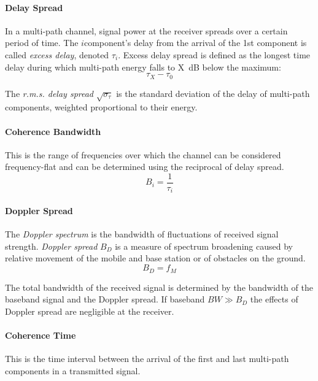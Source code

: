 \paragraph{Delay Spread} In a multi-path channel, signal power at the receiver spreads over a certain period of time. The \(i\)\nth component's delay from the arrival of the 1st component is called \emph{excess delay}, denoted \(\tau_i\)\cite{fuqin}. Excess delay spread is defined as the longest time delay during which multi-path energy falls to X~dB below the maximum:
\[
	\tau_X - \tau_0
\]
\begin{mathDef}
\end{mathDef}
The \emph{r.m.s. delay spread} \(\sqrt{\sigma_\tau}\) is the standard deviation of the delay of multi-path components, weighted proportional to their energy.
\paragraph{Coherence Bandwidth} This is the range of frequencies over which the channel can be considered frequency-flat\cite{Hindu} and can be determined using the reciprocal of delay spread\cite{Salehi}.
\[
	B_i = \frac{1}{\tau_i}
\]
\paragraph{Doppler Spread}
The \emph{Doppler spectrum} is the bandwidth of fluctuations of received signal strength. \emph{Doppler spread} \(B_D\) is a measure of spectrum broadening caused by relative movement of the mobile and base station or of obstacles on the ground.
\[
	B_D = f_M
\]
\begin{mathDef}
\end{mathDef}
The total bandwidth of the received signal is determined by the bandwidth of the baseband signal and the Doppler spread. If baseband \(BW \gg B_D\) the effects of Doppler spread are negligible at the receiver.
\paragraph{Coherence Time}
This is the time interval between the arrival of the first and last multi-path components in a transmitted signal\cite{Hindu}.

